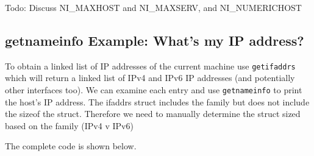 \begin{Shaded}
\begin{Highlighting}[]
      
     \NormalTok{host[}\NormalTok{], port[}\NormalTok{];}
     
\end{Highlighting}
\end{Shaded}

Todo: Discuss NI\_MAXHOST and NI\_MAXSERV, and NI\_NUMERICHOST

\subsection{getnameinfo Example: What's my IP
address?}\label{getnameinfo-example-whats-my-ip-address}

To obtain a linked list of IP addresses of the current machine use
\texttt{getifaddrs} which will return a linked list of IPv4 and IPv6 IP
addresses (and potentially other interfaces too). We can examine each
entry and use \texttt{getnameinfo} to print the host's IP address. The
ifaddrs struct includes the family but does not include the sizeof the
struct. Therefore we need to manually determine the struct sized based
on the family (IPv4 v IPv6)

\begin{Shaded}
\begin{Highlighting}[]
 \NormalTok{(} \NormalTok{(} 
\end{Highlighting}
\end{Shaded}

The complete code is shown below.

